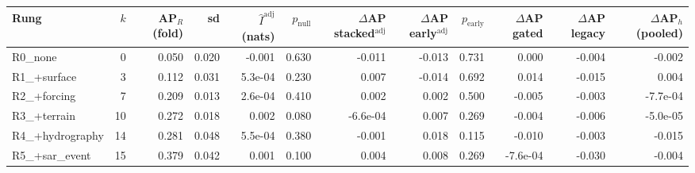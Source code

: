 \begin{tabular}{lrrrrrrrrrrr}
\toprule
Rung & $k$ & AP$_R$ (fold) & sd & $\hat I^{\mathrm{adj}}$ (nats) & $p_{\mathrm{null}}$ & $\Delta$AP stacked$^{\mathrm{adj}}$ & $\Delta$AP early$^{\mathrm{adj}}$ & $p_{\mathrm{early}}$ & $\Delta$AP gated & $\Delta$AP legacy & $\Delta$AP$_h$ (pooled) \\
\midrule
R0\_none & 0 & 0.050 & 0.020 & -0.001 & 0.630 & -0.011 & -0.013 & 0.731 & 0.000 & -0.004 & -0.002 \\
R1\_+surface & 3 & 0.112 & 0.031 & 5.3e-04 & 0.230 & 0.007 & -0.014 & 0.692 & 0.014 & -0.015 & 0.004 \\
R2\_+forcing & 7 & 0.209 & 0.013 & 2.6e-04 & 0.410 & 0.002 & 0.002 & 0.500 & -0.005 & -0.003 & -7.7e-04 \\
R3\_+terrain & 10 & 0.272 & 0.018 & 0.002 & 0.080 & -6.6e-04 & 0.007 & 0.269 & -0.004 & -0.006 & -5.0e-05 \\
R4\_+hydrography & 14 & 0.281 & 0.048 & 5.5e-04 & 0.380 & -0.001 & 0.018 & 0.115 & -0.010 & -0.003 & -0.015 \\
R5\_+sar\_event & 15 & 0.379 & 0.042 & 0.001 & 0.100 & 0.004 & 0.008 & 0.269 & -7.6e-04 & -0.030 & -0.004 \\
\bottomrule
\end{tabular}
